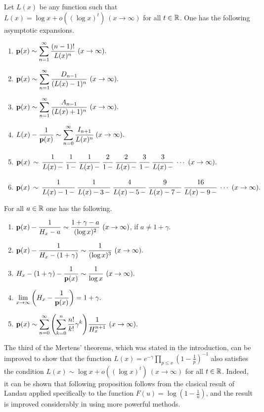 \documentclass[12pt]{article}
\begin{document}
\begin{corollary}\label{pas}
Let $L(x)$ be any function such that $L(x) = \log x + o ((\log x)^t) \  (x \to \infty)$ for all $t \in {\mathbb R}$.  One has the following asymptotic expansions.
\begin{enumerate}
\item $\displaystyle {\mathbf p}(x) \sim \sum_{n = 1}^\infty {\frac {(n-1)!}{L(x)^{n}}} \ (x \to \infty).$
\item $\displaystyle {\mathbf p}(x) \sim \sum_{n = 1}^\infty {\frac {D_{n-1}}{(L(x)-1)^{n}}} \ (x \to \infty).$
\item $\displaystyle  {\mathbf p}(x) \sim \sum_{n = 1}^\infty {\frac {A_{n-1}}{(L(x)+1)^{n}}} \ (x \to \infty).$
\item $\displaystyle L(x) - \frac{1}{{\mathbf p}(x)} \sim  \sum_{n = 0}^{\infty} {\cfrac {I_{n+1}}{L(x)^{n}}} \ (x \to \infty).$
\item $\displaystyle {{\mathbf p}(x)}\,  \sim \, \cfrac{1}{L(x) \,-} \  \cfrac{1}{1 \, -} \  \cfrac{1}{L(x) \,-}\  \cfrac{2}{1 \,-}\  \cfrac{2}{L(x) \,-}  \ \cfrac{3}{1 \,-}\  \cfrac{3}{L(x) \,-} \  \cdots \ (x \to \infty).$
\item $\displaystyle {{\mathbf p}(x)} \,  \sim \, \cfrac{1}{L(x)-1 \,-} \  \cfrac{1}{L(x)-3 \,-} \  \cfrac{4}{L(x)-5 \,-}\  \cfrac{9}{L(x)-7 \,-}\  \cfrac{16}{L(x)-9 \,-} \  \cdots \ (x \to \infty).$
\end{enumerate}
\end{corollary}

\begin{corollary}\label{pas2}
For all $a \in {\mathbb R}$ one has the following.
\begin{enumerate}
\item $\displaystyle {\mathbf p}(x) - \frac{1}{H_x-a} \sim  \frac{1+\gamma-a}{(\log x)^2} \ (x \to \infty)$, if $a \neq 1+\gamma.$
\item $\displaystyle {\mathbf p}(x) - \frac{1}{H_x-(1+\gamma)} \sim  \frac{1}{(\log x)^3} \ (x \to \infty).$
\item $\displaystyle H_x -(1+\gamma) -\frac{1}{{\mathbf p}(x)}  \sim \frac{1}{\log x} \ (x \to \infty).$
\item $\displaystyle \lim_{x \to \infty} \left(H_x -\frac{1}{{\mathbf p}(x)} \right) = 1+\gamma.$
\item $\displaystyle {\mathbf p}(x) \sim \sum_{n = 0}^\infty \left(\sum_{k = 0}^n \frac{n!}{k!}\gamma^k \right)\! \frac{1}{H_x^{n+1}} \ (x \to \infty).$
\end{enumerate}
\end{corollary}


The third of the Mertens' theorems, which was stated in the introduction, can be improved to show that the function 
$L(x) = e^{-\gamma}\prod_{p \leq x}\left(1-\frac{1}{p}\right)^{-1} $ also satisfies the condition $L(x) \sim \log x + o ((\log x)^t) \  (x \to \infty)$ for all $t \in {\mathbb R}$.   Indeed, it can be shown that  following proposition follows  from the clasical result \cite[p.\ 201--203]{land} of Landau applied specifically to the function $F(u) = \log \left(1-\frac{1}{u}\right)$, and the result is improved considerably  in \cite{lam} using more powerful methods.
\end{document}
